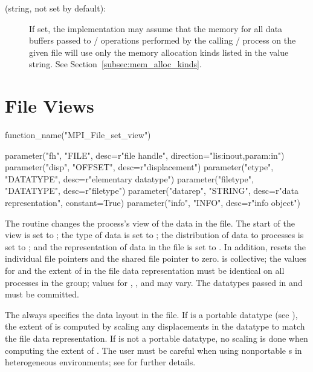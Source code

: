 \begin{description}
\item[ (string, not set by default):]
If set, the implementation may assume that the memory for all
data buffers passed to \MPI/ operations performed by the calling \MPI/
process on the given file will use only the memory allocation kinds
listed in the value string.
See Section~\ref{subsec:mem_alloc_kinds}.

\end{description}

\section{File Views}
\label{sec:io-view}

%
%
%
\begin{mpi-binding}
    function_name("MPI_File_set_view")
    
    parameter("fh", "FILE", desc=r"file handle", direction="lis:inout,param:in")
    parameter("disp", "OFFSET", desc=r"displacement")
    parameter("etype", "DATATYPE", desc=r"elementary datatype")
    parameter("filetype", "DATATYPE", desc=r"filetype")
    parameter("datarep", "STRING", desc=r"data representation", constant=True)
    parameter("info", "INFO", desc=r"info object")
\end{mpi-binding}

The  routine changes the process's view
of the data in the file.
The start of the view is set to ;
the type of data is set to ;
the distribution of data to processes is set to ;
and the representation of data in the file is set to .
In addition,
 resets the individual file pointers and the
shared file pointer to zero.
 is collective;
the values for  and
the extent of  in the file data representation
must be identical on all processes
in the group;
values for , , and  may vary.
The datatypes passed in  and  must
be committed.

The  always specifies the data layout in the file.
If  is a portable datatype (see ),
the extent of  is computed by scaling any displacements
in the datatype to match the file data representation.
If  is not a portable datatype,
no scaling is done when computing the extent of .
The user must be careful when using nonportable s
in heterogeneous environments;
see  for further details.


